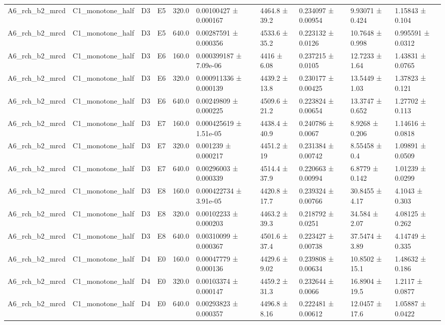 \begin{table}
\begin{tabular}{llllllllll}
A6\_rch\_b2\_mrcd & C1\_monotone\_half & D3 & E5 & 320.0 & 0.00100427 ± 0.000167 & 4464.8 ± 39.2 & 0.234097 ± 0.00954 & 9.93071 ± 0.424 & 1.15843 ± 0.104 \\
A6\_rch\_b2\_mrcd & C1\_monotone\_half & D3 & E5 & 640.0 & 0.00287591 ± 0.000356 & 4533.6 ± 35.2 & 0.223132 ± 0.0126 & 10.7648 ± 0.998 & 0.995591 ± 0.0312 \\
A6\_rch\_b2\_mrcd & C1\_monotone\_half & D3 & E6 & 160.0 & 0.000399187 ± 7.09e-06 & 4416 ± 6.08 & 0.237215 ± 0.0105 & 12.7233 ± 1.64 & 1.43831 ± 0.0765 \\
A6\_rch\_b2\_mrcd & C1\_monotone\_half & D3 & E6 & 320.0 & 0.000911336 ± 0.000139 & 4439.2 ± 13.8 & 0.230177 ± 0.00425 & 13.5449 ± 1.03 & 1.37823 ± 0.121 \\
A6\_rch\_b2\_mrcd & C1\_monotone\_half & D3 & E6 & 640.0 & 0.00249809 ± 0.000225 & 4509.6 ± 21.2 & 0.223824 ± 0.00654 & 13.3747 ± 0.652 & 1.27702 ± 0.113 \\
A6\_rch\_b2\_mrcd & C1\_monotone\_half & D3 & E7 & 160.0 & 0.000425619 ± 1.51e-05 & 4438.4 ± 40.9 & 0.240786 ± 0.0067 & 8.9268 ± 0.206 & 1.14616 ± 0.0818 \\
A6\_rch\_b2\_mrcd & C1\_monotone\_half & D3 & E7 & 320.0 & 0.001239 ± 0.000217 & 4451.2 ± 19 & 0.231384 ± 0.00742 & 8.55458 ± 0.4 & 1.09891 ± 0.0509 \\
A6\_rch\_b2\_mrcd & C1\_monotone\_half & D3 & E7 & 640.0 & 0.00296003 ± 0.000339 & 4514.4 ± 37.9 & 0.220663 ± 0.00994 & 6.8779 ± 0.142 & 1.01239 ± 0.0299 \\
A6\_rch\_b2\_mrcd & C1\_monotone\_half & D3 & E8 & 160.0 & 0.000422734 ± 3.91e-05 & 4420.8 ± 17.7 & 0.239324 ± 0.00766 & 30.8455 ± 4.17 & 4.1043 ± 0.303 \\
A6\_rch\_b2\_mrcd & C1\_monotone\_half & D3 & E8 & 320.0 & 0.00102233 ± 0.000203 & 4463.2 ± 39.3 & 0.218792 ± 0.0251 & 34.584 ± 2.07 & 4.08125 ± 0.262 \\
A6\_rch\_b2\_mrcd & C1\_monotone\_half & D3 & E8 & 640.0 & 0.00310099 ± 0.000367 & 4501.6 ± 37.4 & 0.223427 ± 0.00738 & 37.5474 ± 3.89 & 4.14749 ± 0.335 \\
A6\_rch\_b2\_mrcd & C1\_monotone\_half & D4 & E0 & 160.0 & 0.00047779 ± 0.000136 & 4429.6 ± 9.02 & 0.239808 ± 0.00634 & 10.8502 ± 15.1 & 1.48632 ± 0.186 \\
A6\_rch\_b2\_mrcd & C1\_monotone\_half & D4 & E0 & 320.0 & 0.00103374 ± 0.000147 & 4459.2 ± 31.3 & 0.232644 ± 0.0066 & 16.8904 ± 19.5 & 1.2117 ± 0.0877 \\
A6\_rch\_b2\_mrcd & C1\_monotone\_half & D4 & E0 & 640.0 & 0.00293823 ± 0.000357 & 4496.8 ± 8.16 & 0.222481 ± 0.00612 & 12.0457 ± 17.6 & 1.05887 ± 0.0422 \\

\end{tabular}
\end{table}

